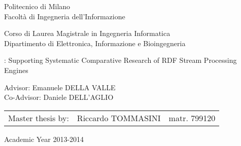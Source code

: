 \begin{titlepage}
\vspace*{-2.5cm}
\bfseries
\begin{center}
  \LARGE
  Politecnico di Milano\\
  \Large
  Facolt\`{a} di Ingegneria dell'Informazione\\


\begin{large}
Corso di Laurea Magistrale in Ingegneria Informatica\\
Dipartimento di Elettronica, Informazione e Bioingegneria\\
\end{large}

\vspace{1.0cm}
\begin{Large}
\name: Supporting Systematic Comparative Research of RDF Stream Processing Engines
\end{Large}  
\end{center}
\vspace*{5.5cm}
\large
\begin{flushleft}
\hspace{-2cm}  Advisor: Emanuele DELLA VALLE\\
\hspace{-2cm}  Co-Advisor: Daniele DELL'AGLIO\\
\end{flushleft}
\vspace*{1.5cm}

\hspace{1.5cm}
\parbox{14cm}{
    \begin{tabular}{lll}
        Master thesis by: & Riccardo TOMMASINI    & matr. 799120\\
    \end{tabular}
}

\vspace*{1.4cm}
\begin{center}

  Academic Year 2013-2014



\end{center}
\end{titlepage}
\cleardoublepage

\thispagestyle{empty}

